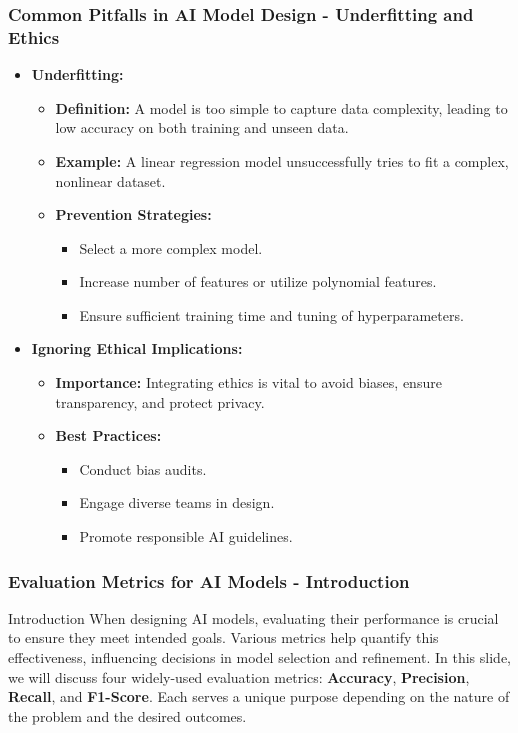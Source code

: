\documentclass[aspectratio=169]{beamer}
\begin{document}
\begin{frame}[fragile]
    \frametitle{Common Pitfalls in AI Model Design - Underfitting and Ethics}
    \begin{itemize}
        \item \textbf{Underfitting:}
            \begin{itemize}
                \item \textbf{Definition:} A model is too simple to capture data complexity, leading to low accuracy on both training and unseen data.
                \item \textbf{Example:} A linear regression model unsuccessfully tries to fit a complex, nonlinear dataset.
                \item \textbf{Prevention Strategies:}
                    \begin{itemize}
                        \item Select a more complex model.
                        \item Increase number of features or utilize polynomial features.
                        \item Ensure sufficient training time and tuning of hyperparameters.
                    \end{itemize}
            \end{itemize}

        \item \textbf{Ignoring Ethical Implications:}
            \begin{itemize}
                \item \textbf{Importance:} Integrating ethics is vital to avoid biases, ensure transparency, and protect privacy.
                \item \textbf{Best Practices:}
                    \begin{itemize}
                        \item Conduct bias audits.
                        \item Engage diverse teams in design.
                        \item Promote responsible AI guidelines.
                    \end{itemize}
            \end{itemize}
    \end{itemize}
\end{frame}

\begin{frame}[fragile]
    \frametitle{Evaluation Metrics for AI Models - Introduction}
    \begin{block}{Introduction}
        When designing AI models, evaluating their performance is crucial to ensure they meet intended goals. 
        Various metrics help quantify this effectiveness, influencing decisions in model selection and refinement.
        In this slide, we will discuss four widely-used evaluation metrics: 
        \textbf{Accuracy}, \textbf{Precision}, \textbf{Recall}, and \textbf{F1-Score}. 
        Each serves a unique purpose depending on the nature of the problem and the desired outcomes.
    \end{block}
\end{frame}
\end{document}
